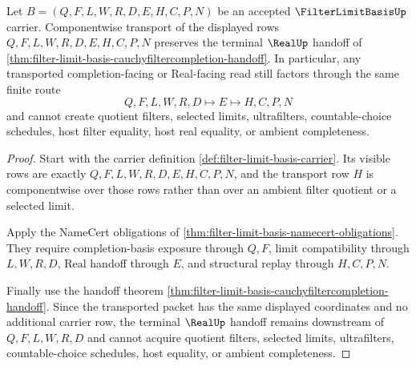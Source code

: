 \begin{theorem}
\label{thm:filter-limit-basis-real-handoff-stability}
Let $B=(Q,F,L,W,R,D,E,H,C,P,N)$ be an accepted $\FilterLimitBasisUp$ carrier. Componentwise transport of the displayed rows $Q,F,L,W,R,D,E,H,C,P,N$ preserves the terminal $\RealUp$ handoff of \autoref{thm:filter-limit-basis-cauchyfiltercompletion-handoff}. In particular, any transported completion-facing or Real-facing read still factors through the same finite route
$$
Q,F,L,W,R,D \longmapsto E \longmapsto H,C,P,N
$$
and cannot create quotient filters, selected limits, ultrafilters, countable-choice schedules, host filter equality, host real equality, or ambient completeness.
\end{theorem}
\begin{proof}
Start with the carrier definition \autoref{def:filter-limit-basis-carrier}. Its visible rows are exactly $Q,F,L,W,R,D,E,H,C,P,N$, and the transport row $H$ is componentwise over those rows rather than over an ambient filter quotient or a selected limit.

Apply the NameCert obligations of \autoref{thm:filter-limit-basis-namecert-obligations}. They require completion-basis exposure through $Q,F$, limit compatibility through $L,W,R,D$, Real handoff through $E$, and structural replay through $H,C,P,N$.

Finally use the handoff theorem \autoref{thm:filter-limit-basis-cauchyfiltercompletion-handoff}. Since the transported packet has the same displayed coordinates and no additional carrier row, the terminal $\RealUp$ handoff remains downstream of $Q,F,L,W,R,D$ and cannot acquire quotient filters, selected limits, ultrafilters, countable-choice schedules, host equality, or ambient completeness.
\end{proof}

